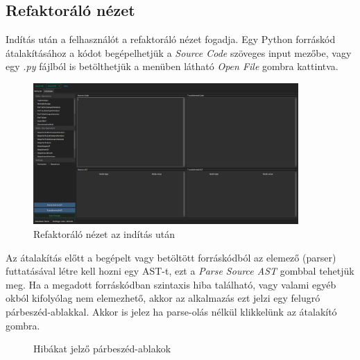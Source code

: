 \subsection{Refaktoráló nézet}

Indítás után a felhasználót a refaktoráló nézet fogadja.
Egy Python forráskód átalakításához a kódot begépelhetjük a \emph{Source Code} szöveges input mezőbe,
vagy egy \emph{.py} fájlból is betölthetjük a menüben látható \emph{Open File} gombra kattintva.

\begin{figure}[H]
	\centering
	\includegraphics[width=0.9\textwidth]{images/screenshots/refactor_tab_1.png}
	\caption{Refaktoráló nézet az indítás után}
\end{figure}

Az átalakítás előtt a begépelt vagy betöltött forráskódból az elemező (parser) futtatásával 
létre kell hozni egy AST-t,
ezt a \emph{Parse Source AST} gombbal tehetjük meg. Ha a megadott forráskódban szintaxis hiba található, 
vagy valami egyéb okból kifolyólag nem elemezhető, akkor az alkalmazás ezt jelzi egy felugró 
párbeszéd-ablakkal. Akkor is jelez ha parse-olás nélkül klikkelünk az átalakító gombra.

\begin{figure}[H]
	\centering
	\hspace{5pt}
	\caption{Hibákat jelző párbeszéd-ablakok}
\end{figure}


